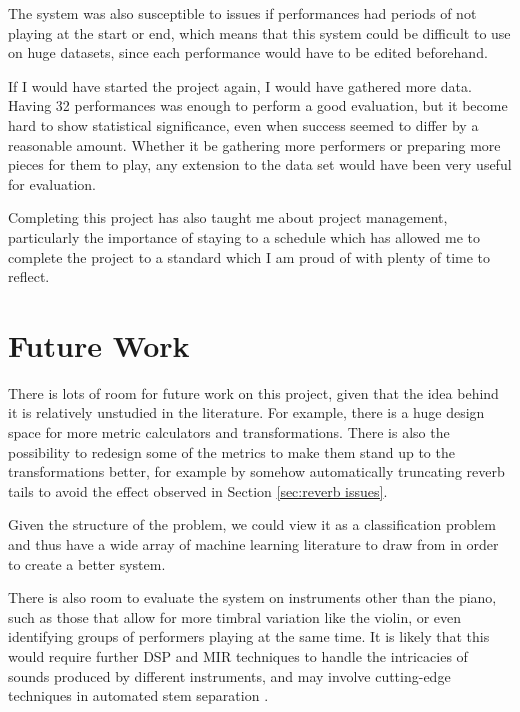 \documentclass[oneside, class=book, 12pt, crop=false]{standalone}
\begin{document}
The system was also susceptible to issues if performances had periods of not playing at the start or end, which means that this system could be difficult to use on huge datasets, since each performance would have to be edited beforehand.

If I would have started the project again, I would have gathered more data. Having 32 performances was enough to perform a good evaluation, but it become hard to show statistical significance, even when success seemed to differ by a reasonable amount. Whether it be gathering more performers or preparing more pieces for them to play, any extension to the data set would have been very useful for evaluation.

Completing this project has also taught me about project management, particularly the importance of staying to a schedule which has allowed me to complete the project to a standard which I am proud of with plenty of time to reflect.

\section{Future Work}

There is lots of room for future work on this project, given that the idea behind it is relatively unstudied in the literature. For example, there is a huge design space for more metric calculators and transformations. There is also the possibility to redesign some of the metrics to make them stand up to the transformations better, for example by somehow automatically truncating reverb tails to avoid the effect observed in Section \ref{sec:reverb issues}.

Given the structure of the problem, we could view it as a classification problem and thus have a wide array of machine learning literature to draw from in order to create a better system.

There is also room to evaluate the system on instruments other than the piano, such as those that allow for more timbral variation like the violin, or even identifying groups of performers playing at the same time. It is likely that this would require further DSP and MIR techniques to handle the intricacies of sounds produced by different instruments, and may involve cutting-edge techniques in automated stem separation \cite{Hennequin2020}.


\ifstandalone
  \printbibliography
\fi
    
\end{document}
